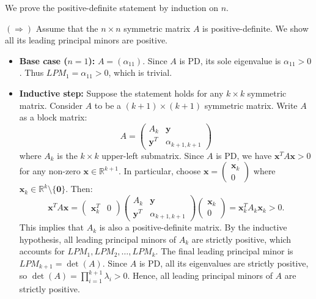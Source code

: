 \begin{pfbox}
	We prove the positive-definite statement by induction on $n$.

	$(\Rightarrow)$ Assume that the $n \times n$ symmetric matrix $A$ is positive-definite. We show all its leading principal minors are positive.
	\begin{itemize}
		\item \textbf{Base case ($n=1$):} $A = (\alpha_{11})$. Since $A$ is PD, its sole eigenvalue is $\alpha_{11} > 0$. Thus $LPM_1 = \alpha_{11} > 0$, which is trivial.
		\item \textbf{Inductive step:} Suppose the statement holds for any $k \times k$ symmetric matrix. Consider $A$ to be a $(k+1) \times (k+1)$ symmetric matrix. Write $A$ as a block matrix:
		      \[
			      A = \begin{pmatrix} A_k & \mathbf{y} \\ \mathbf{y}^T & \alpha_{k+1,k+1} \end{pmatrix}
		      \]
		      where $A_k$ is the $k \times k$ upper-left submatrix. Since $A$ is PD, we have $\mathbf{x}^{T}A\mathbf{x} > 0$ for any non-zero $\mathbf{x} \in \mathbb{R}^{k+1}$. In particular, choose $\mathbf{x} = \begin{pmatrix} \mathbf{x}_k \\ 0 \end{pmatrix}$ where $\mathbf{x}_k \in \mathbb{R}^k \setminus \{\mathbf{0}\}$. Then:
		      \[
			      \mathbf{x}^T A \mathbf{x} = \begin{pmatrix} \mathbf{x}_k^T & 0 \end{pmatrix} \begin{pmatrix} A_k & \mathbf{y} \\ \mathbf{y}^T & \alpha_{k+1,k+1} \end{pmatrix} \begin{pmatrix} \mathbf{x}_k \\ 0 \end{pmatrix} = \mathbf{x}_k^T A_k \mathbf{x}_k > 0.
		      \]
		      This implies that $A_k$ is also a positive-definite matrix. By the inductive hypothesis, all leading principal minors of $A_k$ are strictly positive, which accounts for $LPM_1, LPM_2, \dots, LPM_k$. The final leading principal minor is $LPM_{k+1} = \det(A)$. Since $A$ is PD, all its eigenvalues are strictly positive, so $\det(A) = \displaystyle\prod_{i=1}^{k+1} \lambda_i > 0$. Hence, all leading principal minors of $A$ are strictly positive.
	\end{itemize}


\end{pfbox}
